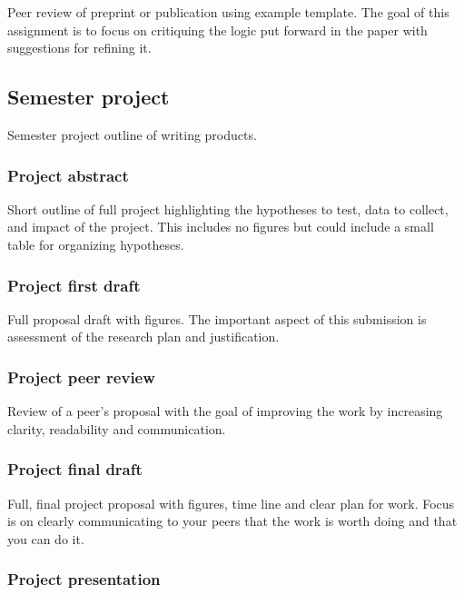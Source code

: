 \documentclass[11pt,]{article}
\begin{document}
Peer review of preprint or publication using example template. The goal
of this assignment is to focus on critiquing the logic put forward in
the paper with suggestions for refining it.

\hypertarget{semester-project}{%
\subsection{Semester project}\label{semester-project}}

Semester project outline of writing products.

\hypertarget{project-abstract}{%
\subsubsection{Project abstract}\label{project-abstract}}

Short outline of full project highlighting the hypotheses to test, data
to collect, and impact of the project. This includes no figures but
could include a small table for organizing hypotheses.

\hypertarget{project-first-draft}{%
\subsubsection{Project first draft}\label{project-first-draft}}

Full proposal draft with figures. The important aspect of this
submission is assessment of the research plan and justification.

\hypertarget{project-peer-review}{%
\subsubsection{Project peer review}\label{project-peer-review}}

Review of a peer's proposal with the goal of improving the work by
increasing clarity, readability and communication.

\hypertarget{project-final-draft}{%
\subsubsection{Project final draft}\label{project-final-draft}}

Full, final project proposal with figures, time line and clear plan for
work. Focus is on clearly communicating to your peers that the work is
worth doing and that you can do it.

\hypertarget{project-presentation}{%
\subsubsection{Project presentation}\label{project-presentation}}
\end{document}
